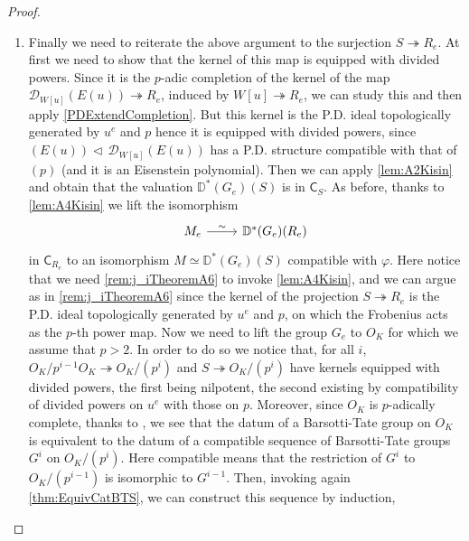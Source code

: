 \begin{proof}
\begin{enumerate}
\item Finally we need to reiterate the above argument to the surjection
	$S \twoheadrightarrow R_e$.
	At first we need to show that the kernel of this map is equipped with divided powers.
	Since it is the $p$-adic completion of the kernel
	of the map $\mathcal{D}_{W[u]}(E(u)) \twoheadrightarrow R_e$,
	induced by $W[u] \twoheadrightarrow R_e$, we can study this and
	then apply \cref{PDExtendCompletion}.
	But this kernel is the P.D. ideal topologically generated 
	by $u^e$ and $p$ hence it is equipped with divided powers,
	since $(E(u)) \triangleleft\, \mathcal{D}_{W[u]}(E(u))$ has a P.D. structure
	compatible with that of $(p)$ (and it is an Eisenstein polynomial).
	Then we can apply \cref{lem:A2Kisin} and obtain that the valuation
	$\mathbb{D}^*(G_e)(S)$ is in $\mathsf{C}_{S}$.
	As before, thanks to \cref{lem:A4Kisin} we lift the isomorphism 
	\begin{equation*}
	\begin{tikzcd}
		M_e \arrow[r, "\sim", rightarrow] &
		\mathbb{D}^*(G_e)(R_e)
	\end{tikzcd}
	\end{equation*}
	in $\mathsf{C}_{R_e}$ to an isomorphism $M \simeq \mathbb{D}^*(G_e)(S)$
	compatible with $\varphi$.
	Here notice that we need \cref{rem:j_iTheoremA6} to invoke
	\cref{lem:A4Kisin}, and we can argue as in \cref{rem:j_iTheoremA6}
	since the kernel of the projection $S \twoheadrightarrow R_e$ is
	the P.D. ideal topologically generated by $u^e$ and $p$,
	on which the Frobenius acts as the $p$-th power map.
	Now we need to lift the group $G_e$ to $O_K$ for which we assume that $p > 2$.
	In order to do so we notice that, for all $i$,
	$O_K/p^{i-1}O_K \twoheadrightarrow O_K/ (p^i)$ and
	$S \twoheadrightarrow O_K/ (p^i)$ have kernels equipped with
	divided powers, the first being nilpotent, the second existing by compatibility
	of divided powers on $u^e$ with those on $p$.
	Moreover, since $O_K$ is $p$-adically complete, thanks to \cite[Lemma 2.4.4]{deJong},
	we see that the datum of a Barsotti-Tate group on $O_K$ is equivalent to
	the datum of a compatible sequence of Barsotti-Tate groups $G^i$ on $O_K/ (p^i)$.
	Here compatible means that the restriction of $G^i$ to $O_K/ (p^{i-1})$
	is isomorphic to $G^{i-1}$.
	Then, invoking again \cref{thm:EquivCatBTS}, we can construct this sequence by induction,

\end{enumerate}
\end{proof}
